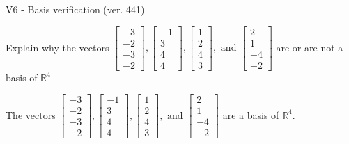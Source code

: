 \begin{exercise}
  \begin{exerciseTitle}V6 - Basis verification (ver. 441)\end{exerciseTitle}
  \begin{exerciseStatement}
    Explain why the vectors \(\left[\begin{array}{r}
-3 \\
-2 \\
-3 \\
-2
\end{array}\right] , \left[\begin{array}{r}
-1 \\
3 \\
4 \\
4
\end{array}\right] , \left[\begin{array}{r}
1 \\
2 \\
4 \\
3
\end{array}\right] , \text{ and } \left[\begin{array}{r}
2 \\
1 \\
-4 \\
-2
\end{array}\right]\) are or are not a basis of \(\mathbb{R}^4\)	


  \end{exerciseStatement}
  \begin{exerciseAnswer}
   The vectors \(\left[\begin{array}{r}
-3 \\
-2 \\
-3 \\
-2
\end{array}\right] , \left[\begin{array}{r}
-1 \\
3 \\
4 \\
4
\end{array}\right] , \left[\begin{array}{r}
1 \\
2 \\
4 \\
3
\end{array}\right] , \text{ and } \left[\begin{array}{r}
2 \\
1 \\
-4 \\
-2
\end{array}\right]\) 
  	 are  a basis of \(\mathbb{R}^4\).
  


  \end{exerciseAnswer}
\end{exercise}